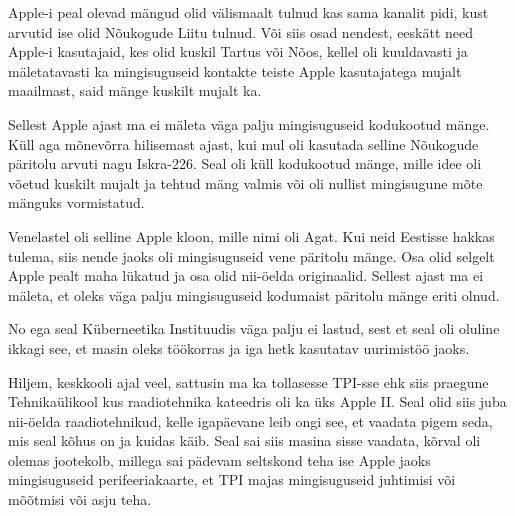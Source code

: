 
Apple-i peal olevad mängud olid välismaalt tulnud kas sama kanalit pidi, kust arvutid ise olid Nõukogude Liitu tulnud. Või siis osad nendest, eeskätt need Apple-i kasutajaid, kes olid kuskil Tartus või Nõos, kellel oli kuuldavasti ja mäletatavasti ka mingisuguseid kontakte teiste Apple kasutajatega mujalt maailmast, said mänge kuskilt mujalt ka.


Sellest Apple ajast ma ei mäleta väga palju mingisuguseid kodukootud mänge. Küll aga mõnevõrra hilisemast ajast, kui mul oli kasutada selline Nõukogude päritolu arvuti nagu Iskra-226. Seal oli küll kodukootud mänge, mille idee oli võetud kuskilt mujalt ja tehtud mäng valmis  või oli nullist mingisugune mõte mänguks vormistatud. 

Venelastel oli selline Apple kloon, mille  nimi oli  Agat. Kui neid Eestisse hakkas tulema, siis nende jaoks oli mingisuguseid vene päritolu mänge. Osa  olid selgelt Apple pealt maha lükatud ja osa olid  nii-öelda originaalid. Sellest ajast ma ei mäleta, et oleks väga palju mingisuguseid kodumaist päritolu mänge eriti olnud.


No ega seal Küberneetika Instituudis väga palju ei lastud, sest et seal oli oluline ikkagi see, et masin oleks töökorras ja iga hetk kasutatav  uurimistöö jaoks.

Hiljem,  keskkooli ajal veel, sattusin ma ka tollasesse TPI-sse ehk siis praegune Tehnikaülikool kus raadiotehnika kateedris oli ka üks Apple II.  Seal olid siis juba nii-öelda raadiotehnikud, kelle igapäevane leib ongi see,  et vaadata pigem seda, mis seal kõhus on ja kuidas käib. Seal sai siis masina sisse vaadata, kõrval oli olemas  jootekolb, millega sai pädevam seltskond teha ise Apple jaoks mingisuguseid perifeeriakaarte, et TPI majas mingisuguseid juhtimisi või mõõtmisi või asju teha.  

